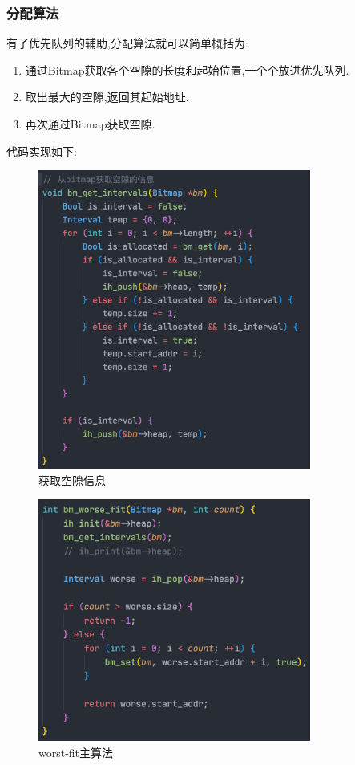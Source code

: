 \subsubsection{分配算法}

有了优先队列的辅助,分配算法就可以简单概括为:

\begin{enumerate}[itemindent=1em]
    \item 通过Bitmap获取各个空隙的长度和起始位置,一个个放进优先队列.
    \item 取出最大的空隙,返回其起始地址.
    \item 再次通过Bitmap获取空隙.
\end{enumerate}

代码实现如下:

\begin{figure}[H]
    \centering
    \includegraphics[width=0.8\textwidth]{figures/wf0.png}
    \caption{获取空隙信息}
    \label{fig:my_label}
\end{figure}

\begin{figure}[H]
    \centering
    \includegraphics[width=0.8\textwidth]{figures/wf1.png}
    \caption{worst-fit主算法}
    \label{fig:my_label}
\end{figure}

